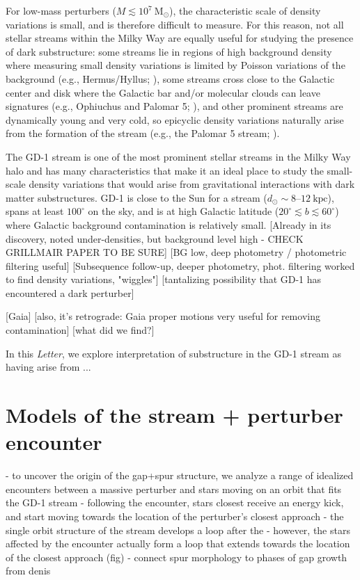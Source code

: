 \documentclass[12pt, modern]{aastex62}
\newcommand{\articlename}{\textsl{Letter}}
\newcommand{\msun}{\textrm{M}_\odot}
\begin{document}
For low-mass perturbers ($M \lesssim 10^7~\msun$), the characteristic scale of density variations is small, and is therefore difficult to measure.
For this reason, not all stellar streams within the Milky Way are equally useful for studying the presence of dark substructure: some streams lie in regions of high background density where measuring small density variations is limited by Poisson variations of the background (e.g., Hermus/Hyllus; \citealt{Grillmair:2014}), some streams cross close to the Galactic center and disk where the Galactic bar and/or molecular clouds can leave signatures (e.g., Ophiuchus and Palomar 5; \citealt{Price-Whelan:2016; Pearson:2017, Amorisco:2016}), and other prominent streams are dynamically young and very cold, so epicyclic density variations naturally arise from the formation of the stream (e.g., the Palomar 5 stream; \citealt{Kupper:2008, Kupper:2015}).

The GD-1 stream \citep{Grillmair:2006, Price-Whelan:2018} is one of the most prominent stellar streams in the Milky Way halo and has many characteristics that make it an ideal place to study the small-scale density variations that would arise from gravitational interactions with dark matter substructures.
GD-1 is close to the Sun for a stream ($d_\odot \sim 8$--$12~\textrm{kpc}$), spans at least $100^\circ$ on the sky, and is at high Galactic latitude ($20^\circ \lesssim b \lesssim 60^\circ$) where Galactic background contamination is relatively small.
[Already in its discovery, noted under-densities, but background level high - CHECK GRILLMAIR PAPER TO BE SURE]
[BG low, deep photometry / photometric filtering useful]
[Subsequence follow-up, deeper photometry, phot. filtering worked to find density variations, "wiggles"]
[tantalizing possibility that GD-1 has encountered a dark perturber]

[Gaia]
[also, it's retrograde: Gaia proper motions very useful for removing contamination]
[what did we find?]

In this \articlename, we explore interpretation of substructure in the GD-1 stream as having arise from ...


\section{Models of the stream + perturber encounter}
\label{sec:model}
- to uncover the origin of the gap+spur structure, we analyze a range of idealized encounters between a massive perturber and stars moving on an orbit that fits the GD-1 stream
- following the encounter, stars closest receive an energy kick, and start moving towards the location of the perturber's closest approach
- the single orbit structure of the stream develops a loop after the
- however, the stars affected by the encounter actually form a loop that extends towards the location of the closest approach (fig)
- connect spur morphology to phases of gap growth from denis
\end{document}
